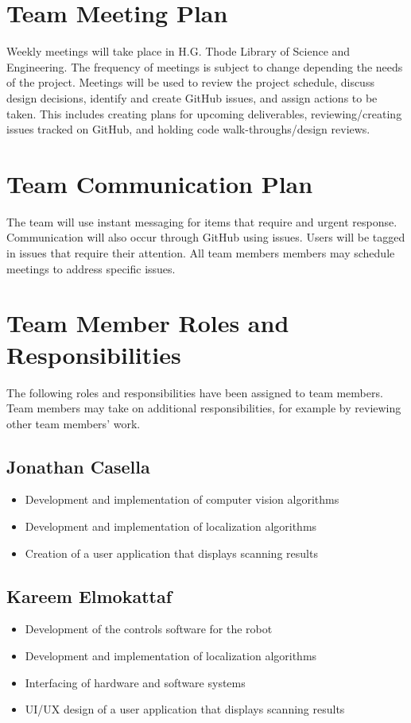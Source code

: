 \documentclass[titlepage]{article}
\begin{document}
\section{Team Meeting Plan}

Weekly meetings will take place in H.G. Thode Library of Science and Engineering. The frequency of meetings is subject to change depending the needs of the project. Meetings will be used to review the project schedule, discuss design decisions, identify and create GitHub issues, and assign actions to be taken. This includes creating plans for upcoming deliverables, reviewing/creating issues tracked on GitHub, and holding code walk-throughs/design reviews. 

\section{Team Communication Plan}

The team will use instant messaging for items that require and urgent response. Communication will also occur through GitHub using issues. Users will be tagged in issues that require their attention. All team members members may schedule  meetings to address specific issues. 

\section{Team Member Roles and Responsibilities}

The following roles and responsibilities  have been assigned to team members. Team members may take on additional responsibilities, for example by reviewing other team members' work. 

\subsection{Jonathan Casella}
\begin{itemize}
\item Development and implementation of computer vision algorithms
\item Development and implementation of localization algorithms
\item Creation of a user application that displays scanning results
\end{itemize}

\subsection{Kareem Elmokattaf}
\begin{itemize}
\item Development of the controls software for the robot
\item Development and implementation of localization algorithms
\item Interfacing of hardware and software systems
\item UI/UX design of a user application that displays scanning results
\end{itemize}
\end{document}
